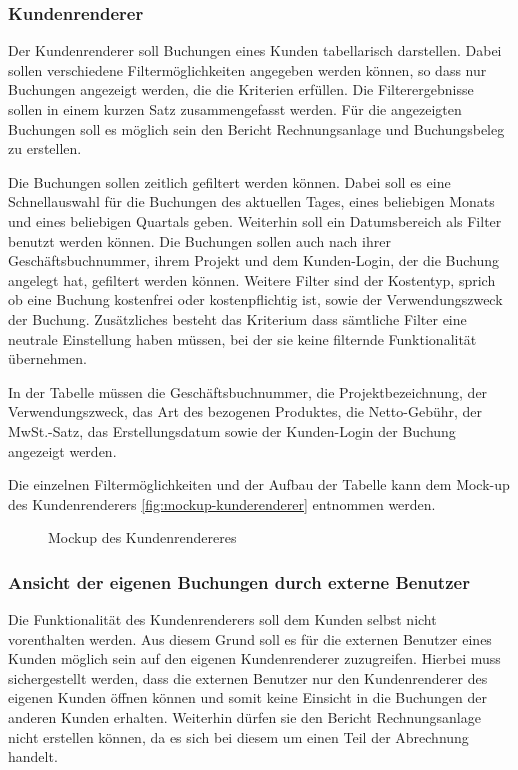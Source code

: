 \subsubsection{Kundenrenderer}
Der Kundenrenderer soll Buchungen eines Kunden tabellarisch darstellen.
Dabei sollen verschiedene Filtermöglichkeiten angegeben werden können, so dass nur Buchungen angezeigt werden, die die Kriterien erfüllen.
Die Filterergebnisse sollen in einem kurzen Satz zusammengefasst werden.
Für die angezeigten Buchungen soll es möglich sein den Bericht Rechnungsanlage und Buchungsbeleg zu erstellen.

Die Buchungen sollen zeitlich gefiltert werden können.
Dabei soll es eine Schnellauswahl für die Buchungen des aktuellen Tages, eines beliebigen Monats und eines beliebigen Quartals geben.
Weiterhin soll ein Datumsbereich als Filter benutzt werden können.
Die Buchungen sollen auch nach ihrer Geschäftsbuchnummer, ihrem Projekt und dem Kunden-Login, der die Buchung angelegt hat, gefiltert werden können.
Weitere Filter sind der Kostentyp, sprich ob eine Buchung kostenfrei oder kostenpflichtig ist, sowie der Verwendungszweck der Buchung. Zusätzliches besteht das Kriterium dass sämtliche Filter eine neutrale Einstellung haben müssen, bei der sie keine filternde Funktionalität übernehmen.

In der Tabelle müssen die Geschäftsbuchnummer, die Projektbezeichnung, der Verwendungszweck, das Art des bezogenen Produktes, die Netto-Gebühr, der MwSt.-Satz, das Erstellungsdatum sowie der Kunden-Login der Buchung angezeigt werden.

Die einzelnen Filtermöglichkeiten und der Aufbau der Tabelle kann dem Mock-up des Kundenrenderers \vref{fig:mockup-kunderenderer} entnommen werden.

\begin{figure}[htb]
	\centering
	\caption{Mockup des Kundenrendereres}
	\label{fig:mockup-kunderenderer}
\end{figure}

\subsubsection{Ansicht der eigenen Buchungen durch externe Benutzer}
Die Funktionalität des Kundenrenderers soll dem Kunden selbst nicht vorenthalten werden.
Aus diesem Grund soll es für die externen Benutzer eines Kunden möglich sein auf den eigenen Kundenrenderer zuzugreifen.
Hierbei muss sichergestellt werden, dass die externen Benutzer nur den Kundenrenderer des eigenen Kunden öffnen können und somit keine Einsicht in die Buchungen der anderen Kunden erhalten. 
Weiterhin dürfen sie den Bericht Rechnungsanlage nicht erstellen können, da es sich bei diesem um einen Teil der Abrechnung handelt.

